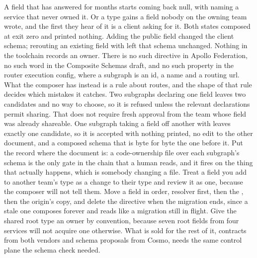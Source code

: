 \begin{problemsummary}
{A field that has answered for months starts coming back null, with
 naming a service that never owned it. Or
a type gains a field nobody on the owning team wrote, and the first they hear
of it is a client asking for it. Both states composed at exit zero and printed
nothing. Adding the public field changed the client schema; rerouting an
existing field with  left that schema unchanged.}
{Nothing in the toolchain records an owner. There is no such directive in
Apollo Federation, no such word in the Composite Schemas draft, and no such
property in the router execution config, where a subgraph is an id, a name and
a routing url. What the composer has instead is a rule about routes, and the
shape of that rule decides which mistakes it catches. Two subgraphs declaring
one field leaves two candidates and no way to choose, so it is refused unless
the relevant declarations permit sharing. That does not require fresh
approval from the team whose field was already shareable.
One subgraph taking a field off another with  leaves exactly
one candidate, so it is accepted with nothing printed, no edit to the other
document, and a composed schema that is byte for byte the one before it.}
{Put the record where the document is: a code-ownership file over each
subgraph's schema is the only gate in the chain that a human reads, and it
fires on the thing that actually happens, which is somebody changing a file.
Treat a field you add to another team's type as a change to their type and
review it as one, because the composer will not tell them. Move a field in
order, resolver first, then the , then the origin's copy, and
delete the directive when the migration ends, since a stale one composes
forever and reads like a migration still in flight. Give the shared root type
an owner by convention, because seven root fields from four services will not
acquire one otherwise. What is sold for the rest of it, contracts from both
vendors and schema proposals from Cosmo, needs the same control plane the
schema check needed.}
\end{problemsummary}
